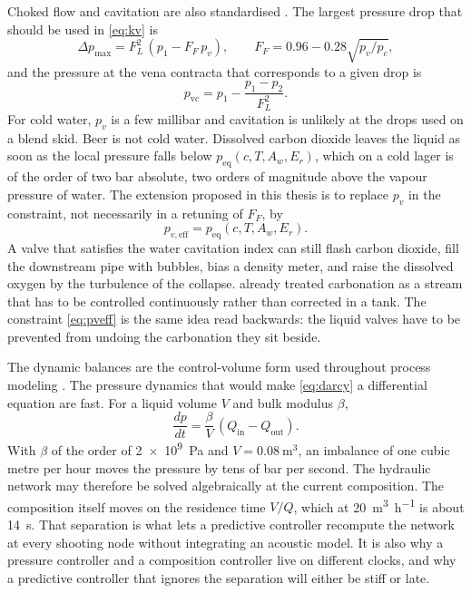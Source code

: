 Choked flow and cavitation are also standardised \citep{iec60534,isa75,fisher2005}. The largest pressure drop that should be used in \eqref{eq:kv} is
\begin{equation}
\label{eq:choke}
\Delta p_{\max} = F_L^{2}\,(p_1 - F_F\,p_v),
\qquad
F_F = 0.96 - 0.28\sqrt{p_v/p_c},
\end{equation}
and the pressure at the vena contracta that corresponds to a given drop is
\begin{equation}
\label{eq:pvc}
p_{\mathrm{vc}} = p_1 - \frac{p_1-p_2}{F_L^{2}}.
\end{equation}
For cold water, $p_v$ is a few millibar and cavitation is unlikely at the drops used on a blend skid. Beer is not cold water. Dissolved carbon dioxide leaves the liquid as soon as the local pressure falls below $p_{\mathrm{eq}}(c,T,A_w,E_r)$, which on a cold lager is of the order of two bar absolute, two orders of magnitude above the vapour pressure of water. The extension proposed in this thesis is to replace $p_v$ in the constraint, not necessarily in a retuning of $F_F$, by
\begin{equation}
\label{eq:pveff}
p_{v,\mathrm{eff}} = p_{\mathrm{eq}}(c,T,A_w,E_r).
\end{equation}
A valve that satisfies the water cavitation index can still flash carbon dioxide, fill the downstream pipe with bubbles, bias a density meter, and raise the dissolved oxygen by the turbulence of the collapse. \citet{rohner1970} already treated carbonation as a stream that has to be controlled continuously rather than corrected in a tank. The constraint \eqref{eq:pveff} is the same idea read backwards: the liquid valves have to be prevented from undoing the carbonation they sit beside.

The dynamic balances are the control-volume form used throughout process modeling \citep{luyben1990}. The pressure dynamics that would make \eqref{eq:darcy} a differential equation are fast. For a liquid volume $V$ and bulk modulus $\beta$,
\begin{equation}
\label{eq:bulk}
\frac{dp}{dt} = \frac{\beta}{V}\,(Q_{\mathrm{in}}-Q_{\mathrm{out}}).
\end{equation}
With $\beta$ of the order of \SI{2e9}{\pascal} and $V=\SI{0.08}{\cubic\metre}$, an imbalance of one cubic metre per hour moves the pressure by tens of bar per second. The hydraulic network may therefore be solved algebraically at the current composition. The composition itself moves on the residence time $V/Q$, which at \SI{20}{\cubic\metre\per\hour} is about \SI{14}{\second}. That separation is what lets a predictive controller recompute the network at every shooting node without integrating an acoustic model. It is also why a pressure controller and a composition controller live on different clocks, and why a predictive controller that ignores the separation will either be stiff or late.

